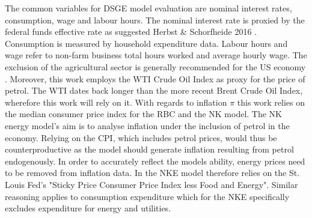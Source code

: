 \documentclass[12pt,a4paper,english]{article} %
\begin{document}
	The common variables for DSGE model evaluation are nominal interest rates, consumption, wage and labour hours. The nominal interest rate is proxied by the federal funds effective rate as suggested Herbst \& Schorfheide 2016 \cite{herbst_bayesian_2016}. Consumption is measured by household expenditure data. Labour hours and wage refer to non-farm business total hours worked and average hourly wage. The exclusion of the agricultural sector is generally recommended for the US economy \cite{guerron-quintana_bayesian_2013}. Moreover, this work employs the WTI Crude Oil Index as proxy for the price of petrol. The WTI dates back longer than the more recent Brent Crude Oil Index, wherefore this work will rely on it.
	With regards to inflation $\pi$ this work relies on the median consumer price index for the RBC and the NK model. The NK energy model's aim is to analyse inflation under the inclusion of petrol in the economy. Relying on the CPI, which includes petrol prices, would thus be counterproductive as the model should generate inflation resulting from petrol endogenously. In order to accurately reflect the models ability, energy prices need to be removed from inflation data. In the NKE model therefore relies on the St. Louis Fed's "Sticky Price Consumer Price Index less Food and Energy". Similar reasoning applies to consumption expenditure which for the NKE specifically excludes expenditure for energy and utilities.
	
\end{document}
